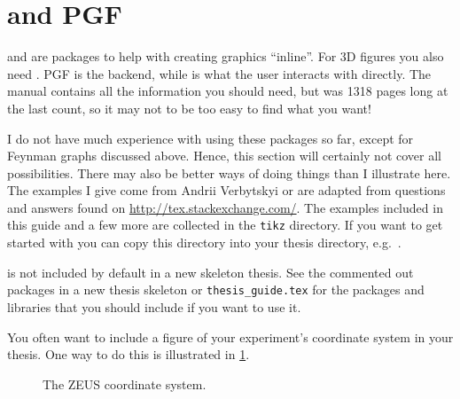 \section{\TikZ and PGF}%
\label{sec:fig:tikz}

 and \Package{\TikZ} are packages to help with
creating graphics \enquote{inline}.
For 3D figures you also need .
PGF is the backend, while \TikZ is what the user interacts with directly.
The manual contains all the information you should need,
but was 1318 pages long at the last count,
so it may not to be too easy to find what you want!

I do not have much experience with using these packages so far,
except for Feynman graphs discussed above.
Hence, this section will certainly not cover all possibilities. There may
also be better ways of doing things than I illustrate here. The
examples I give come from Andrii Verbytskyi or are adapted from
questions and answers found on
\url{http://tex.stackexchange.com/}.
The examples included in this
guide and a few more are collected in the \texttt{tikz} directory.
If you want to get started with \TikZ you can copy this directory
into your thesis directory, e.g.\ .

\TikZ is not included by default in a new skeleton thesis. See the
commented out packages in a new thesis skeleton or
\texttt{thesis\_guide.tex} for the packages and \TikZ libraries that
you should include if you want to use it.

You often want to include a figure of your experiment's coordinate
system in your thesis. One way to do this is illustrated in
\cref{fig:tikz:coord}.

\begin{figure}[htbp]
  \centering
  
  \caption{The ZEUS coordinate system.}%
  \label{fig:tikz:coord}
\end{figure}

